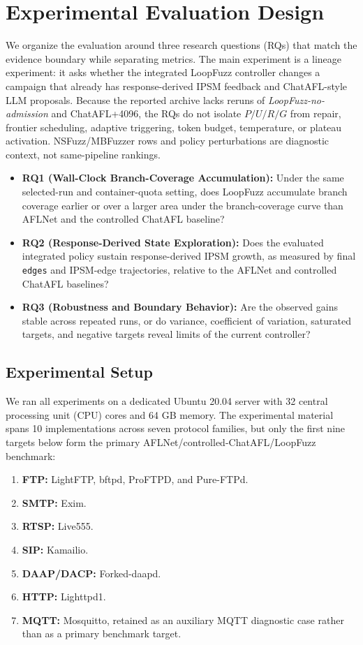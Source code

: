 \documentclass[final,5p,times,number]{elsarticle}
\begin{document}
\section{Experimental Evaluation Design}

We organize the evaluation around three research questions (RQs) that match the evidence boundary while separating metrics. The main experiment is a lineage experiment: it asks whether the integrated LoopFuzz controller changes a campaign that already has response-derived IPSM feedback and ChatAFL-style LLM proposals. Because the reported archive lacks reruns of \emph{LoopFuzz-no-admission} and ChatAFL+4096, the RQs do not isolate $P/U/R/G$ from repair, frontier scheduling, adaptive triggering, token budget, temperature, or plateau activation. NSFuzz/MBFuzzer rows and policy perturbations are diagnostic context, not same-pipeline rankings.
\begin{itemize}
    \item \textbf{RQ1 (Wall-Clock Branch-Coverage Accumulation):} Under the same selected-run and container-quota setting, does LoopFuzz accumulate branch coverage earlier or over a larger area under the branch-coverage curve than AFLNet and the controlled ChatAFL baseline?
    \item \textbf{RQ2 (Response-Derived State Exploration):} Does the evaluated integrated policy sustain response-derived IPSM growth, as measured by final \texttt{edges} and IPSM-edge trajectories, relative to the AFLNet and controlled ChatAFL baselines?
    \item \textbf{RQ3 (Robustness and Boundary Behavior):} Are the observed gains stable across repeated runs, or do variance, coefficient of variation, saturated targets, and negative targets reveal limits of the current controller?
\end{itemize}

\subsection{Experimental Setup}
We ran all experiments on a dedicated Ubuntu 20.04 server with 32 central processing unit (CPU) cores and 64 GB memory. The experimental material spans 10 implementations across seven protocol families, but only the first nine targets below form the primary AFLNet/controlled-ChatAFL/LoopFuzz benchmark:
\begin{enumerate}
    \item \textbf{FTP:} LightFTP, bftpd, ProFTPD, and Pure-FTPd.
    \item \textbf{SMTP:} Exim.
    \item \textbf{RTSP:} Live555.
    \item \textbf{SIP:} Kamailio.
    \item \textbf{DAAP/DACP:} Forked-daapd.
    \item \textbf{HTTP:} Lighttpd1.
    \item \textbf{MQTT:} Mosquitto, retained as an auxiliary MQTT diagnostic case rather than as a primary benchmark target.
\end{enumerate}
\end{document}
